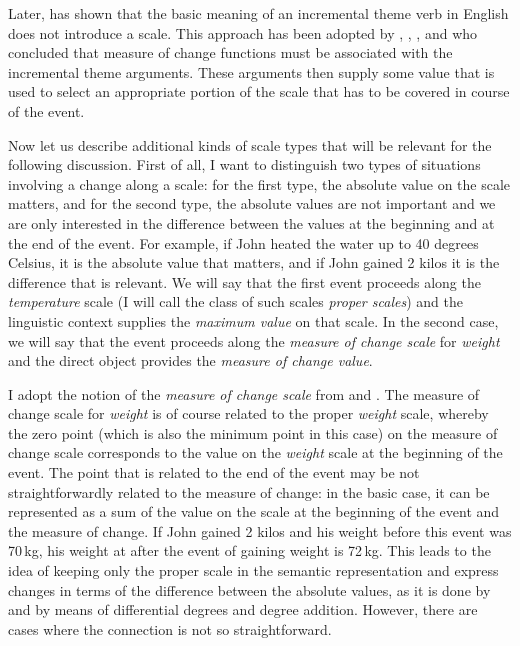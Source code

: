 Later, \citet{Filip:05} has shown that the basic meaning of an incremental theme verb in English does not introduce a scale. This approach has been adopted by \citet{Rappaport:08}, \citet{LevinRappaport:10}, \citet{Kennedy:12}, and \citet{Bochnak:13} who concluded that measure of change functions must be associated with the incremental theme arguments. These arguments then supply some value that is used to select an appropriate portion of the scale that has to be covered in course of the event. 

Now let us describe additional kinds of scale types that will be relevant for the following discussion. First of all, I want to distinguish two types of situations involving a change along a scale: for the first type, the absolute value on the scale matters, and for the second type, the absolute values are not important and we are only interested in the difference between the values at the beginning and at the end of the event. For example, if John heated the water up to 40 degrees Celsius, it is the absolute value that matters, and if John gained 2 kilos it is the difference that is relevant. We will say that the first event proceeds along the \textit{temperature} scale (I will call the class of such scales \textit{proper scales}) and the linguistic context supplies the \textit{maximum value} on that scale. In the second case, we will say that the event proceeds along the \textit{measure of change scale} for \textit{weight} and the direct object provides the \textit{measure of change value}. 

I adopt the notion of the \textit{measure of change scale} from \citet{KennedyLevin:08} and \citet{Kennedy:12}. The measure of change scale for \textit{weight} is of course related to the proper \textit{weight} scale, whereby the zero point (which is also the minimum point in this case) on the measure of change scale corresponds to the value on the \textit{weight} scale at the beginning of the event. The point that is related to the end of the event may be not straightforwardly related to the measure of change: in the basic case, it can be represented as a sum of the value on the scale at the beginning of the event and the measure of change. If John gained 2 kilos and his weight before this event was 70\,kg, his weight at after the event of gaining weight is 72\,kg. This leads to the idea of keeping only the proper scale in the semantic representation and express changes in terms of the difference between the absolute values, as it is done by \citet{Kennedy:01} and \citet{KennedyLevin:02} by means of differential degrees and degree addition. However, there are cases where the connection is not so straightforward.

